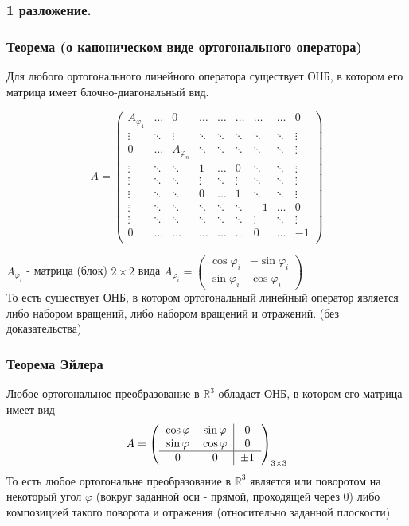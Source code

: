 \documentclass[12pt, letterpaper, twoside]{article}
\newcommand{\mb}[1]{\mathbb{#1}}
\begin{document}
    \subsubsection*{1 разложение.}
    \subsubsection*{Теорема (о каноническом виде ортогонального оператора)}
    Для любого ортогонального линейного оператора существует ОНБ, в котором его матрица имеет блочно-диагональный вид.
    
    \[A = \begin{pmatrix}
        A_{\varphi_1} & \dots & 0 & \dots  &\dots &\dots &\dots &\dots & 0\\
        \vdots & \ddots & \vdots & \ddots   &\ddots &\ddots &\ddots &\ddots &\vdots\\
        0 & \dots &  A_{\varphi_n} & \ddots & \ddots&\ddots &\ddots &\ddots &\vdots\\
        \vdots & \ddots & \ddots & 1        &\dots & 0 &\ddots &\ddots &\vdots\\
        \vdots & \ddots & \ddots & \vdots    &\ddots &\vdots &\ddots &\ddots &\vdots\\
        \vdots & \ddots & \ddots & 0    &\dots & 1 &\ddots &\ddots &\vdots\\
        \vdots & \ddots & \ddots & \ddots    &\ddots &\ddots &-1 &\dots & 0\\
        \vdots & \ddots & \ddots & \ddots    &\ddots &\ddots &\vdots &\ddots &\vdots\\
        0 & \dots & \dots & \dots&\dots &\dots & 0 &\dots &-1\\
    \end{pmatrix}\]

    $A_{\varphi_i}$ - матрица (блок) $2\times 2$ вида $A_{\varphi_i} = \begin{pmatrix}
        \cos \varphi_i & -\sin \varphi_i\\
        \sin \varphi_i & \cos \varphi_i
    \end{pmatrix}$\\
    То есть существует ОНБ, в котором ортогональный линейный оператор является либо набором вращений, либо набором вращений и отражений. (без доказательства)
    \subsubsection*{Теорема Эйлера}
    Любое ортогональное преобразование в $\mb{R}^3$ обладает ОНБ, в котором его матрица имеет вид
    \[A = \left(\begin{tabular} {c c | c}
        $\cos \varphi$ & $\sin\varphi$ & 0\\
        $\sin \varphi$ & $\cos \varphi$ & 0\\
        \hline
        0 & 0 & $\pm 1$
    \end{tabular}\right)_{3\times 3}\]
    То есть любое ортогональне преобразование в $\mathbb{R}^3$ является или поворотом на некоторый угол $\varphi$ (вокруг заданной оси - прямой, проходящей через 0) либо композицией такого поворота и отражения (относительно заданной плоскости)
\end{document}
